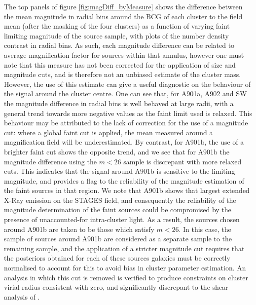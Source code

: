\documentclass[useAMS,usenatbib,times,letter,amssymb]{mn2e}
\begin{document}
The top panels of figure \ref{fig:magDiff_byMeasure} shows the difference between the mean magnitude in radial bins around the BCG of each cluster to the field mean (after the masking of the four clusters) as a function of varying faint limiting magnitude of the source sample, with plots of the number density contrast in radial bins. As such, each magnitude difference can be related to average magnification factor for sources within that annulus, however one must note that this measure has not been corrected for the application of size and magnitude cuts, and is therefore not an unbiased estimate of the cluster mass. However, the use of this estimate can give a useful diagnostic on the behaviour of the signal around the cluster centre.  One can see that, for A901a, A902 and SW the magnitude difference in radial bins is well behaved at large radii, with a general trend towards more negative values as the faint limit used is relaxed. This behaviour may be attributed to the lack of correction for the use of a magnitude cut: where a global faint cut is applied, the mean measured around a magnification field will be underestimated. By contrast, for A901b, the use of a brighter faint cut shows the opposite trend, and we see that for A901b the magnitude difference using the $m<26$  sample is discrepant with more relaxed cuts. This indicates that the signal around A901b is sensitive to the limiting magnitude, and provides a flag to the reliability of the magnitude estimation of the faint sources in that region. We note that A901b shows that largest extended X-Ray emission on the STAGES field, and consequently the reliability of the magnitude determination of the faint sources could be compromised by the presence of unaccounted-for intra-cluster light. As a result, the sources chosen around A901b are taken to be those which satisfy $m<26$. In this case, the sample of sources around A901b are considered as a separate sample to the remaining sample, and the application of a stricter magnitude cut requires that the posteriors obtained for each of these sources galaxies must be correctly normalised to account for this to avoid bias in cluster parameter estimation.  An analysis in which this cut is removed is verified to produce constraints on cluster virial radius consistent with zero, and significantly discrepant to the shear analysis of \cite{Heymans:2008p2060}.
\end{document}
